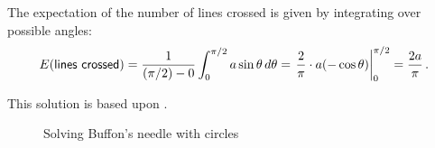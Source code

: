 The expectation of the number of lines crossed is given by integrating over possible angles:
\begin{equation}\label{eq.buffon-integral}
E(\textsf{lines crossed}) =
  \displaystyle\frac{1}{(\pi/2)-0} \int_0^{\pi/2} a\sin \theta\,
  d\theta=\left.\displaystyle\frac{2}{\pi}\cdot a (-\cos \theta)
  \right|_0^{\pi/2}=\displaystyle\frac{2a}{\pi}\,.
\end{equation}

 This solution is based upon \cite[Chapter~26]{proofs}.

\begin{figure}[tb]
\begin{center}
\end{center}
\caption{Solving Buffon's needle with circles}\label{f.buffon3}
\end{figure}

